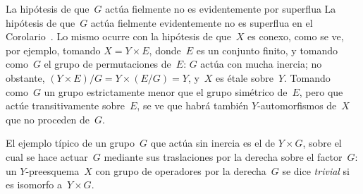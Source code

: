 
\begin{remarque}
\label{V.2.5}
{La hipótesis de que~$G$ actúa fielmente no es evidentemente por superflua}
{La hipótesis de que~$G$ actúa fielmente evidentemente no es superflua}
en el Corolario~. Lo mismo ocurre con la hipótesis de que~$X$ es
conexo, como se ve, por ejemplo, tomando $X=Y\times E$, donde~$E$ es un
conjunto finito, y tomando como~$G$ el grupo de permutaciones de~$E$: $G$
actúa con mucha inercia; no obstante,
$(Y\times E)/G=Y\times(E/G)=Y$, y~$X$ es étale sobre~$Y$. Tomando como~$G$
un grupo estrictamente menor que el grupo simétrico de~$E$, pero que actúe
transitivamente sobre~$E$, se ve que habrá también $Y$-automorfismos de~$X$
que no proceden de~$G$.
\end{remarque}

El ejemplo típico de un grupo~$G$ que actúa sin inercia es el de
$Y\times G$, sobre el cual se hace actuar~$G$ mediante sus traslaciones por
la derecha sobre el factor~$G$: un $Y$-preesquema~$X$ con grupo de operadores
por la derecha~$G$ se dice \emph{trivial} si es isomorfo a~$Y\times G$.

